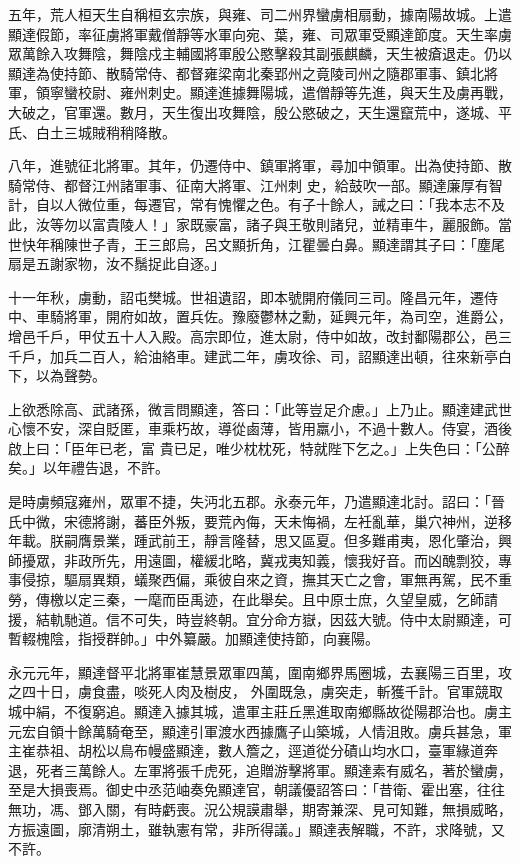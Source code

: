\begin{pinyinscope}
 五年，荒人桓天生自稱桓玄宗族，與雍、司二州界蠻虜相扇動，據南陽故城。上遣顯達假節，率征虜將軍戴僧靜等水軍向宛、葉，雍、司眾軍受顯達節度。天生率虜眾萬餘入攻舞陰，舞陰戍主輔國將軍殷公愍擊殺其副張麒麟，天生被瘡退走。仍以顯達為使持節、散騎常侍、都督雍梁南北秦郢州之竟陵司州之隨郡軍事、鎮北將軍，領寧蠻校尉、雍州刺史。顯達進據舞陽城，遣僧靜等先進，與天生及虜再戰，大破之，官軍還。數月，天生復出攻舞陰，殷公愍破之，天生還竄荒中，遂城、平氏、白土三城賊稍稍降散。



 八年，進號征北將軍。其年，仍遷侍中、鎮軍將軍，尋加中領軍。出為使持節、散騎常侍、都督江州諸軍事、征南大將軍、江州刺
 史，給鼓吹一部。顯達廉厚有智計，自以人微位重，每遷官，常有愧懼之色。有子十餘人，誡之曰：「我本志不及此，汝等勿以富貴陵人！」家既豪富，諸子與王敬則諸兒，並精車牛，麗服飾。當世快年稱陳世子青，王三郎烏，呂文顯折角，江瞿曇白鼻。顯達謂其子曰：「塵尾扇是五謝家物，汝不鬚捉此自逐。」



 十一年秋，虜動，詔屯樊城。世祖遺詔，即本號開府儀同三司。隆昌元年，遷侍中、車騎將軍，開府如故，置兵佐。豫廢鬱林之勳，延興元年，為司空，進爵公，增邑千戶，甲仗五十人入殿。高宗即位，進太尉，侍中如故，改封鄱陽郡公，邑三千戶，加兵二百人，給油絡車。建武二年，虜攻徐、司，詔顯達出頓，往來新亭白下，以為聲勢。



 上欲悉除高、武諸孫，微言問顯達，答曰：「此等豈足介慮。」上乃止。顯達建武世心懷不安，深自貶匿，車乘朽故，導從鹵薄，皆用羸小，不過十數人。侍宴，酒後啟上曰：「臣年已老，富
 貴已足，唯少枕枕死，特就陛下乞之。」上失色曰：「公醉矣。」以年禮告退，不許。



 是時虜頻寇雍州，眾軍不捷，失沔北五郡。永泰元年，乃遣顯達北討。詔曰：「晉氏中微，宋德將謝，蕃臣外叛，要荒內侮，天未悔禍，左衽亂華，巢穴神州，逆移年載。朕嗣膺景業，踵武前王，靜言隆替，思又區夏。但多難甫夷，恩化肇治，興師擾眾，非政所先，用遠圖，權緩北略，冀戎夷知義，懷我好音。而凶醜剽狡，專事侵掠，驅扇異類，蟻聚西偏，乘彼自來之資，撫其天亡之會，軍無再駕，民不重勞，傳檄以定三秦，一麾而臣禹迹，在此舉矣。且中原士庶，久望皇威，乞師請援，結軌馳道。信不可失，時豈終朝。宜分命方嶽，因茲大號。侍中太尉顯達，可暫輟槐陰，指授群帥。」中外纂嚴。加顯達使持節，向襄陽。



 永元元年，顯達督平北將軍崔慧景眾軍四萬，圍南鄉界馬圈城，去襄陽三百里，攻之四十日，虜食盡，啖死人肉及樹皮，
 外圍既急，虜突走，斬獲千計。官軍競取城中絹，不復窮追。顯達入據其城，遣軍主莊丘黑進取南鄉縣故從陽郡治也。虜主元宏自領十餘萬騎奄至，顯達引軍渡水西據鷹子山築城，人情沮敗。虜兵甚急，軍主崔恭祖、胡松以鳥布幔盛顯達，數人簷之，逕道從分磧山均水口，臺軍緣道奔退，死者三萬餘人。左軍將張千虎死，追贈游擊將軍。顯達素有威名，著於蠻虜，至是大損喪焉。御史中丞范岫奏免顯達官，朝議優詔答曰：「昔衛、霍出塞，往往無功，馮、鄧入關，有時虧喪。況公規謨肅舉，期寄兼深、見可知難，無損威略，方振遠圖，廓清朔土，雖執憲有常，非所得議。」顯達表解職，不許，求降號，又不許。




\end{pinyinscope}
